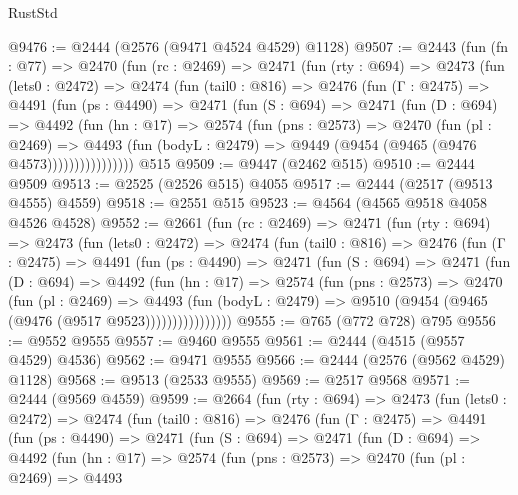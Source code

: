 \begin{lexlean}{RustStd}
\begin{coremodule}
@9476 := @2444 (@2576 (@9471 @4524 @4529) @1128)
@9507 := @2443
    (fun (fn : @77) =>
    @2470
      (fun (rc : @2469) =>
      @2471
        (fun (rty : @694) =>
        @2473
          (fun (lets0 : @2472) =>
          @2474
            (fun (tail0 : @816) =>
            @2476
              (fun (Γ : @2475) =>
              @4491
                (fun (ps : @4490) =>
                @2471
                  (fun (S : @694) =>
                  @2471
                    (fun (D : @694) =>
                    @4492
                      (fun (hn : @17) =>
                      @2574
                        (fun (pns : @2573) =>
                        @2470
                          (fun (pl : @2469) =>
                          @4493
                            (fun (bodyL : @2479) => @9449 (@9454 (@9465 (@9476 @4573))))))))))))))))
    @515
@9509 := @9447 (@2462 @515)
@9510 := @2444 @9509
@9513 := @2525 (@2526 @515) @4055
@9517 := @2444 (@2517 (@9513 @4555) @4559)
@9518 := @2551 @515
@9523 := @4564 (@4565 @9518 @4058 @4526 @4528)
@9552 := @2661
    (fun (rc : @2469) =>
    @2471
      (fun (rty : @694) =>
      @2473
        (fun (lets0 : @2472) =>
        @2474
          (fun (tail0 : @816) =>
          @2476
            (fun (Γ : @2475) =>
            @4491
              (fun (ps : @4490) =>
              @2471
                (fun (S : @694) =>
                @2471
                  (fun (D : @694) =>
                  @4492
                    (fun (hn : @17) =>
                    @2574
                      (fun (pns : @2573) =>
                      @2470
                        (fun (pl : @2469) =>
                        @4493
                          (fun (bodyL : @2479) =>
                          @9510 (@9454 (@9465 (@9476 (@9517 @9523))))))))))))))))
@9555 := @765 (@772 @728) @795
@9556 := @9552 @9555
@9557 := @9460 @9555
@9561 := @2444 (@4515 (@9557 @4529) @4536)
@9562 := @9471 @9555
@9566 := @2444 (@2576 (@9562 @4529) @1128)
@9568 := @9513 (@2533 @9555)
@9569 := @2517 @9568
@9571 := @2444 (@9569 @4559)
@9599 := @2664
    (fun (rty : @694) =>
    @2473
      (fun (lets0 : @2472) =>
      @2474
        (fun (tail0 : @816) =>
        @2476
          (fun (Γ : @2475) =>
          @4491
            (fun (ps : @4490) =>
            @2471
              (fun (S : @694) =>
              @2471
                (fun (D : @694) =>
                @4492
                  (fun (hn : @17) =>
                  @2574
                    (fun (pns : @2573) =>
                    @2470
                      (fun (pl : @2469) =>
                      @4493

\end{coremodule}
\end{lexlean}
